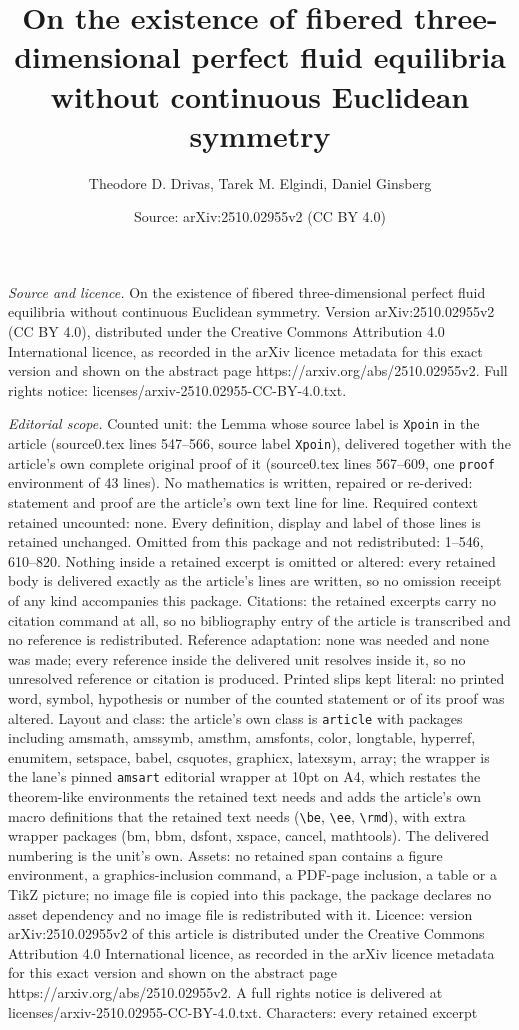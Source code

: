 \documentclass[10pt,a4paper]{amsart}
\title[On the existence of fibered three-dimensional perfect fluid ]{On the existence of fibered three-dimensional perfect fluid equilibria without continuous Euclidean symmetry}
\author{Theodore D. Drivas, Tarek M. Elgindi, Daniel Ginsberg}
\date{Source: arXiv:2510.02955v2 (CC BY 4.0)}
\begin{document}
\maketitle

\noindent\emph{Source and licence.} On the existence of fibered three-dimensional perfect fluid equilibria without continuous Euclidean symmetry. Version arXiv:2510.02955v2 (CC BY 4.0), distributed under the Creative Commons Attribution 4.0 International licence, as recorded in the arXiv licence metadata for this exact version and shown on the abstract page https://arxiv.org/abs/2510.02955v2. Full rights notice: licenses/arxiv-2510.02955-CC-BY-4.0.txt.\par\smallskip

\noindent\textit{Editorial scope.} Counted unit: the Lemma whose source label is \texttt{Xpoin} in the article (source0.tex lines 547--566, source label \texttt{Xpoin}), delivered together with the article's own complete original proof of it (source0.tex lines 567--609, one \texttt{proof} environment of 43 lines). No mathematics is written, repaired or re-derived: statement and proof are the article's own text line for line. Required context retained uncounted: none. Every definition, display and label of those lines is retained unchanged. Omitted from this package and not redistributed: 1--546, 610--820. Nothing inside a retained excerpt is omitted or altered: every retained body is delivered exactly as the article's lines are written, so no omission receipt of any kind accompanies this package. Citations: the retained excerpts carry no citation command at all, so no bibliography entry of the article is transcribed and no reference is redistributed. Reference adaptation: none was needed and none was made; every reference inside the delivered unit resolves inside it, so no unresolved reference or citation is produced. Printed slips kept literal: no printed word, symbol, hypothesis or number of the counted statement or of its proof was altered. Layout and class: the article's own class is \texttt{article} with packages including amsmath, amssymb, amsthm, amsfonts, color, longtable, hyperref, enumitem, setspace, babel, csquotes, graphicx, latexsym, array; the wrapper is the lane's pinned \texttt{amsart} editorial wrapper at 10pt on A4, which restates the theorem-like environments the retained text needs and adds the article's own macro definitions that the retained text needs (\texttt{\textbackslash be}, \texttt{\textbackslash ee}, \texttt{\textbackslash rmd}), with extra wrapper packages (bm, bbm, dsfont, xspace, cancel, mathtools). The delivered numbering is the unit's own. Assets: no retained span contains a figure environment, a graphics-inclusion command, a PDF-page inclusion, a table or a TikZ picture; no image file is copied into this package, the package declares no asset dependency and no image file is redistributed with it. Licence: version arXiv:2510.02955v2 of this article is distributed under the Creative Commons Attribution 4.0 International licence, as recorded in the arXiv licence metadata for this exact version and shown on the abstract page https://arxiv.org/abs/2510.02955v2. A full rights notice is delivered at licenses/arxiv-2510.02955-CC-BY-4.0.txt. Characters: every retained excerpt 
\end{document}
